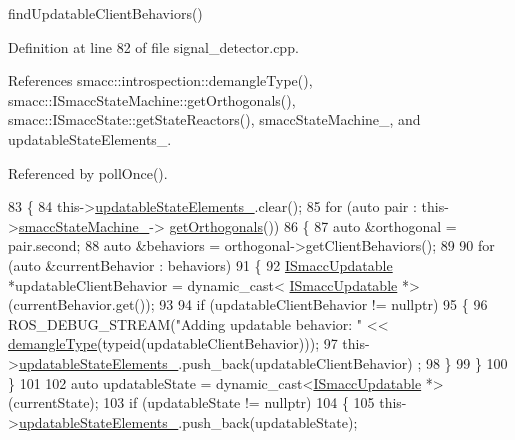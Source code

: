 find\+Updatable\+Client\+Behaviors() 

Definition at line 82 of file signal\+\_\+detector.\+cpp.



References smacc\+::introspection\+::demangle\+Type(), smacc\+::\+I\+Smacc\+State\+Machine\+::get\+Orthogonals(), smacc\+::\+I\+Smacc\+State\+::get\+State\+Reactors(), smacc\+State\+Machine\+\_\+, and updatable\+State\+Elements\+\_\+.



Referenced by poll\+Once().


\begin{DoxyCode}
83     \{
84         this->\hyperlink{classsmacc_1_1SignalDetector_a07a5e7bb00c348435d954e22682fa610}{updatableStateElements\_}.clear();
85         \textcolor{keywordflow}{for} (\textcolor{keyword}{auto} pair : this->\hyperlink{classsmacc_1_1SignalDetector_a46025de6ac7b5980e22144f9703236a4}{smaccStateMachine\_}->
      \hyperlink{classsmacc_1_1ISmaccStateMachine_a7f5b2882dbd077584767cb2533ed3c49}{getOrthogonals}())
86         \{
87             \textcolor{keyword}{auto} &orthogonal = pair.second;
88             \textcolor{keyword}{auto} &behaviors = orthogonal->getClientBehaviors();
89 
90             \textcolor{keywordflow}{for} (\textcolor{keyword}{auto} &currentBehavior : behaviors)
91             \{
92                 \hyperlink{classISmaccUpdatable}{ISmaccUpdatable} *updatableClientBehavior = \textcolor{keyword}{dynamic\_cast<}
      \hyperlink{classISmaccUpdatable}{ISmaccUpdatable} *\textcolor{keyword}{>}(currentBehavior.get());
93 
94                 \textcolor{keywordflow}{if} (updatableClientBehavior != \textcolor{keyword}{nullptr})
95                 \{
96                     ROS\_DEBUG\_STREAM(\textcolor{stringliteral}{"Adding updatable behavior: "} << 
      \hyperlink{namespacesmacc_1_1introspection_a670e39ccea29952859df4e2d0e45077b}{demangleType}(\textcolor{keyword}{typeid}(updatableClientBehavior)));
97                     this->\hyperlink{classsmacc_1_1SignalDetector_a07a5e7bb00c348435d954e22682fa610}{updatableStateElements\_}.push\_back(updatableClientBehavior)
      ;
98                 \}
99             \}
100         \}
101 
102         \textcolor{keyword}{auto} updatableState = \textcolor{keyword}{dynamic\_cast<}\hyperlink{classISmaccUpdatable}{ISmaccUpdatable} *\textcolor{keyword}{>}(currentState);
103         \textcolor{keywordflow}{if} (updatableState != \textcolor{keyword}{nullptr})
104         \{
105             this->\hyperlink{classsmacc_1_1SignalDetector_a07a5e7bb00c348435d954e22682fa610}{updatableStateElements\_}.push\_back(updatableState);

\end{DoxyCode}

